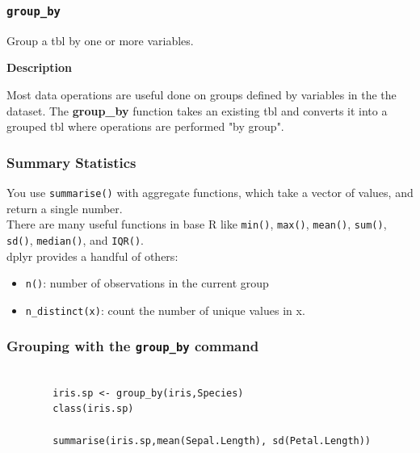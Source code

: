 \documentclass{beamer}
\begin{document}
	\begin{frame}
		\frametitle{\texttt{group\_by }}
		
		Group a tbl by one or more variables.\\ \bigskip
		
		\textbf{Description}\\ \bigskip
		
		Most data operations are useful done on groups defined by variables in the the dataset. The
		\textbf{group\_by} function takes an existing tbl and converts it into a grouped tbl where operations are
		performed "by group".
		
	\end{frame}
	\begin{frame}
		\frametitle{Summary Statistics}
		You use \texttt{summarise()} with aggregate functions, which take a vector of values, and return a single number.\\ \bigskip There are many useful functions in base R like \texttt{min()}, \texttt{max()}, \texttt{mean()}, \texttt{sum()}, \texttt{sd()}, \texttt{median()}, and \texttt{IQR()}.\\ \bigskip dplyr provides a handful of others:
		\begin{itemize}
			\item 
			\texttt{n()}: number of observations in the current group
			\item 
			\texttt{n\_distinct(x)}: count the number of unique values in x.
		\end{itemize}
		
	\end{frame}
	\begin{frame}[fragile]
		\frametitle{Grouping with the \texttt{group\_by} command}
		\begin{verbatim}
		
		iris.sp <- group_by(iris,Species)
		class(iris.sp)
		
		summarise(iris.sp,mean(Sepal.Length), sd(Petal.Length))
		
		\end{verbatim}
	\end{frame}
\end{document}
